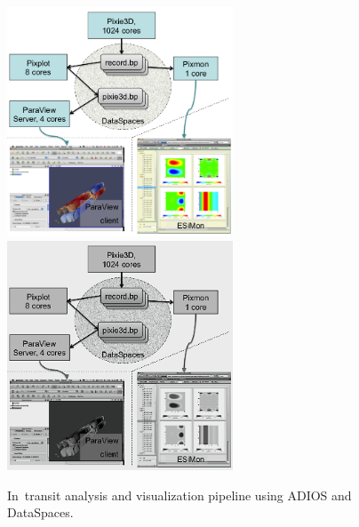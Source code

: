 \begin{figure}[h!]
\centering
\myIfColor
{
\includegraphics[width=0.6\textwidth]{Chapters/part3-ch5-adios/figs/intransitviz.png}
}
{
\includegraphics[width=0.6\textwidth]{Chapters/part3-ch5-adios/figs/intransitviz-bw.png}
}
\caption[]
{In~transit analysis and visualization pipeline using ADIOS and DataSpaces.
}
\label{part3-ch5-adios:fig:intransitviz}
\end{figure}

